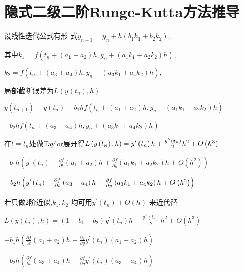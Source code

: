 \documentclass{ctexart}
\begin{document}
\bigskip 

\section{隐式二级二阶Runge-Kutta方法推导}

设线性迭代公式有形%
式$y_{n+1}=y_{n}+h\left( b_{1}k_{1}+b_{2}k_{2}\right) ,$

其中$k_{1}=f\left( t_{n}+\left( a_{1}+a_{2}\right)
h,y_{n}+\left( a_{1}k_{1}+a_{2}k_{2}\right) h\right) ,$

$k_{2}=f\left( t_{n}+\left( a_{3}+a_{4}\right) h,y_{n}+\left(
a_{3}k_{1}+a_{4}k_{2}\right) h\right) ,$

局部截断误差为$L\left( y\left(
t_{n}\right) ,h\right) =$

$y\left( t_{n+1}\right) -y\left( t_{n}\right) -b_{1}hf\left( t_{n}+\left(
a_{1}+a_{2}\right) h,y_{n}+\left( a_{1}k_{1}+a_{2}k_{2}\right) h\right) $

$-b_{2}hf\left( t_{n}+\left( a_{3}+a_{4}\right) h,y_{n}+\left(
a_{3}k_{1}+a_{4}k_{2}\right) h\right) $

在$t=t_{n}$处做Taylor展开得$L\left(
y\left( t_{n}\right) ,h\right) =y^{\prime }\left( t_{n}\right) h+\frac{%
y^{\prime \prime }\left( t_{n}\right) }{2}h^{2}+O\left( h^{3}\right) $

$-b_{1}h\left( y^{\prime }\left( t_{n}\right) +\frac{\partial f}{\partial t}%
\left( a_{1}+a_{2}\right) h+\frac{\partial f}{\partial y}\left(
a_{1}k_{1}+a_{2}k_{2}\right) h+O\left( h^{2}\right) \right) $

\bigskip $-b_{2}h\left( y^{\prime }\left( t_{n}\right) +\frac{\partial f}{%
\partial t}\left( a_{3}+a_{4}\right) h+\frac{\partial f}{\partial y}\left(
a_{3}k_{1}+a_{4}k_{2}\right) h+O\left( h^{2}\right) \right) $

\bigskip 若只做2阶近似,$k_{1},k_{2}$%
均可用$y^{\prime }\left( t_{n}\right) +O\left( h\right) $%
来近代替

$L\left( y\left( t_{n}\right) ,h\right) =\left( 1-b_{1}-b_{2}\right)
y^{\prime }\left( t_{n}\right) h+\frac{y^{\prime \prime }\left( t_{n}\right) 
}{2}h^{2}+O\left( h^{3}\right) $

$-b_{1}h\left( \frac{\partial f}{\partial t}\left( a_{1}+a_{2}\right) h+%
\frac{\partial f}{\partial y}y^{\prime }\left( t_{n}\right) \left(
a_{1}+a_{2}\right) h\right) $

\bigskip $-b_{2}h\left( \frac{\partial f}{\partial t}\left(
a_{3}+a_{4}\right) h+\frac{\partial f}{\partial y}y^{\prime }\left(
t_{n}\right) \left( a_{3}+a_{4}\right) h\right) $
\end{document}
